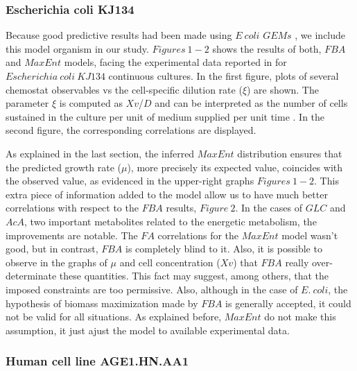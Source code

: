 \documentclass[]{article}
\begin{document}
	
	
	\subsubsection{Escherichia coli KJ134}
	
	Because good predictive results had been made using $E\ coli$ $GEMs$ , we include this model organism in our study.
	$Figures\ 1-2$ shows the results of both, $FBA$ and $MaxEnt$ models, facing the experimental data reported in  for $Escherichia\ coli\ KJ134$ continuous cultures. 
	In the first figure, plots of several chemostat observables vs the cell-specific dilution rate ($\xi$) are shown. 
	The parameter $\xi$ is computed as $Xv$/$D$ and can be interpreted as the number of cells sustained in the culture per unit of medium supplied per unit time . 
	In the second figure, the corresponding correlations are displayed.
	
	As explained in the last section, the inferred $MaxEnt$ distribution ensures that the predicted growth rate ($\mu$), more precisely its expected value, coincides with the observed value, as evidenced in the upper-right graphs $Figures\ 1-2$. 
	This extra piece of information added to the model allow us to have much better correlations with respect to the $FBA$ results, $Figure\ 2$.
	In the cases of $GLC$ and $AcA$, two important metabolites related to the energetic metabolism, the improvements are notable.
	The $FA$ correlations for the $MaxEnt$ model wasn't good, but in contrast, $FBA$ is completely blind to it.
	Also, it is possible to observe in the graphs of $\mu$ and cell concentration ($Xv$)  that $FBA$ really over-determinate these quantities. 
	This fact may suggest, among others, that the imposed constraints are too permissive. 
	Also, although in the case of $E.\ coli$, the hypothesis of biomass maximization made by $FBA$ is generally accepted, it could not be valid for all situations.
	As explained before, $MaxEnt$ do not make this assumption, it just ajust the model to available experimental data.


	\subsubsection{Human cell line AGE1.HN.AA1}
\end{document}
